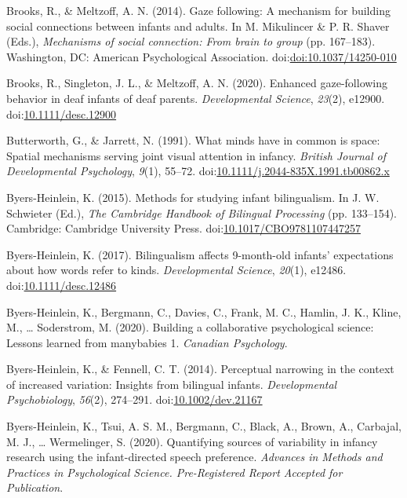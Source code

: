 \documentclass[,man,floatsintext]{apa6}
\begin{document}
\leavevmode\hypertarget{ref-Brooks_Meltzoff_2014}{}%
Brooks, R., \& Meltzoff, A. N. (2014). Gaze following: A mechanism for building social connections between infants and adults. In M. Mikulincer \& P. R. Shaver (Eds.), \emph{Mechanisms of social connection: From brain to group} (pp. 167--183). Washington, DC: American Psychological Association. doi:\href{https://doi.org/doi:10.1037/14250-010}{doi:10.1037/14250-010}

\leavevmode\hypertarget{ref-Brooks_etal_2020}{}%
Brooks, R., Singleton, J. L., \& Meltzoff, A. N. (2020). Enhanced gaze-following behavior in deaf infants of deaf parents. \emph{Developmental Science}, \emph{23}(2), e12900. doi:\href{https://doi.org/10.1111/desc.12900}{10.1111/desc.12900}

\leavevmode\hypertarget{ref-Butterworth_Jarrett_1991}{}%
Butterworth, G., \& Jarrett, N. (1991). What minds have in common is space: Spatial mechanisms serving joint visual attention in infancy. \emph{British Journal of Developmental Psychology}, \emph{9}(1), 55--72. doi:\href{https://doi.org/10.1111/j.2044-835X.1991.tb00862.x}{10.1111/j.2044-835X.1991.tb00862.x}

\leavevmode\hypertarget{ref-Byers-Heinlein_2015}{}%
Byers-Heinlein, K. (2015). Methods for studying infant bilingualism. In J. W. Schwieter (Ed.), \emph{The Cambridge Handbook of Bilingual Processing} (pp. 133--154). Cambridge: Cambridge University Press. doi:\href{https://doi.org/10.1017/CBO9781107447257}{10.1017/CBO9781107447257}

\leavevmode\hypertarget{ref-Byers-Heinlein_2017}{}%
Byers-Heinlein, K. (2017). Bilingualism affects 9-month-old infants' expectations about how words refer to kinds. \emph{Developmental Science}, \emph{20}(1), e12486. doi:\href{https://doi.org/10.1111/desc.12486}{10.1111/desc.12486}

\leavevmode\hypertarget{ref-Byers-Heinlein_etal_2020a}{}%
Byers-Heinlein, K., Bergmann, C., Davies, C., Frank, M. C., Hamlin, J. K., Kline, M., \ldots{} Soderstrom, M. (2020). Building a collaborative psychological science: Lessons learned from manybabies 1. \emph{Canadian Psychology}.

\leavevmode\hypertarget{ref-Byers-Heinlein_Fennell_2014}{}%
Byers-Heinlein, K., \& Fennell, C. T. (2014). Perceptual narrowing in the context of increased variation: Insights from bilingual infants. \emph{Developmental Psychobiology}, \emph{56}(2), 274--291. doi:\href{https://doi.org/10.1002/dev.21167}{10.1002/dev.21167}

\leavevmode\hypertarget{ref-Byers-Heinlein_etal_2020b}{}%
Byers-Heinlein, K., Tsui, A. S. M., Bergmann, C., Black, A., Brown, A., Carbajal, M. J., \ldots{} Wermelinger, S. (2020). Quantifying sources of variability in infancy research using the infant-directed speech preference. \emph{Advances in Methods and Practices in Psychological Science. Pre-Registered Report Accepted for Publication}.
\end{document}
